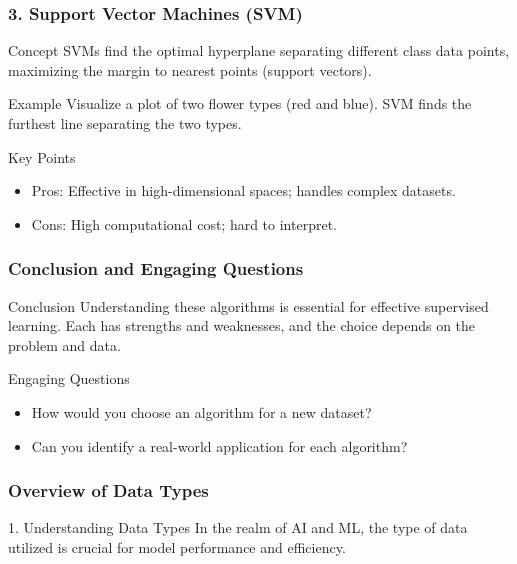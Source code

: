 \documentclass[aspectratio=169]{beamer}
\begin{document}
\begin{frame}[fragile]
    \frametitle{3. Support Vector Machines (SVM)}
    \begin{block}{Concept}
        SVMs find the optimal hyperplane separating different class data points, maximizing the margin to nearest points (support vectors).
    \end{block}
    
    \begin{block}{Example}
        Visualize a plot of two flower types (red and blue). SVM finds the furthest line separating the two types.
    \end{block}
    
    \begin{block}{Key Points}
        \begin{itemize}
            \item Pros: Effective in high-dimensional spaces; handles complex datasets.
            \item Cons: High computational cost; hard to interpret.
        \end{itemize}
    \end{block}
\end{frame}

\begin{frame}[fragile]
    \frametitle{Conclusion and Engaging Questions}
    \begin{block}{Conclusion}
        Understanding these algorithms is essential for effective supervised learning. Each has strengths and weaknesses, and the choice depends on the problem and data.
    \end{block}
    
    \begin{block}{Engaging Questions}
        \begin{itemize}
            \item How would you choose an algorithm for a new dataset?
            \item Can you identify a real-world application for each algorithm?
        \end{itemize}
    \end{block}
\end{frame}

\begin{frame}[fragile]
    \frametitle{Overview of Data Types}
    \begin{block}{1. Understanding Data Types}
        In the realm of AI and ML, the type of data utilized is crucial for model performance and efficiency.
    \end{block}
\end{frame}
\end{document}
